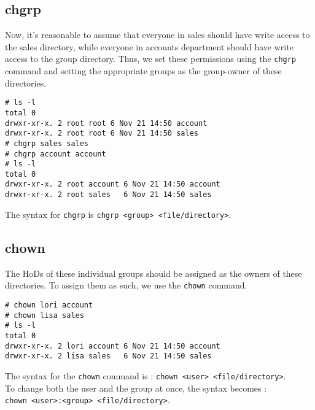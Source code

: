 \subsection{chgrp}
Now, it's reasonable to assume that everyone in sales should have write access to the sales directory, while everyone in accounts department should have write access to the group directory. Thus, we set these permissions using the \verb|chgrp| command and setting the appropriate groups as the group-owner of these directories. 

\vspace{-15pt}
\begin{verbatim}
# ls -l
total 0
drwxr-xr-x. 2 root root 6 Nov 21 14:50 account
drwxr-xr-x. 2 root root 6 Nov 21 14:50 sales
# chgrp sales sales
# chgrp account account
# ls -l
total 0
drwxr-xr-x. 2 root account 6 Nov 21 14:50 account
drwxr-xr-x. 2 root sales   6 Nov 21 14:50 sales
\end{verbatim}
\vspace{-10pt}

\noindent
The syntax for \verb|chgrp| is \verb|chgrp <group> <file/directory>|.

\subsection{chown}
The HoDs of these individual groups should be assigned as the owners of these directories. To assign them as such, we use the \verb|chown| command. 

\vspace{-15pt}
\begin{verbatim}
# chown lori account
# chown lisa sales
# ls -l
total 0
drwxr-xr-x. 2 lori account 6 Nov 21 14:50 account
drwxr-xr-x. 2 lisa sales   6 Nov 21 14:50 sales
\end{verbatim}
\vspace{-10pt}

\noindent
The syntax for the \verb|chown| command is : \verb|chown <user> <file/directory>|. \\
To change both the user and the group at once, the syntax becomes : \\ \verb|chown <user>:<group> <file/directory>|.

